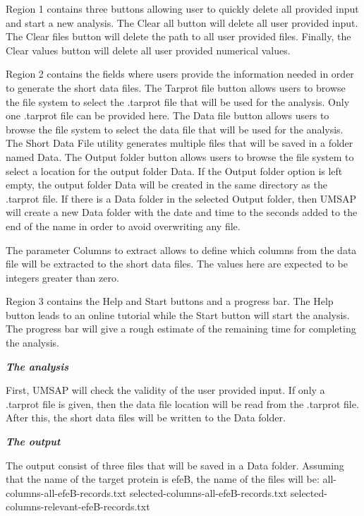 Region \num{1} contains three buttons allowing user to quickly delete all provided input and start a new analysis. The Clear all button will delete all user provided input. The Clear files button will delete the path to all user provided files. Finally, the Clear values button will delete all user provided numerical values.

Region \num{2} contains the fields where users provide the information needed in order to generate the short data files. The Tarprot file button allows users to browse the file system to select the .tarprot file that will be used for the analysis. Only one .tarprot file can be provided here. The Data file button allows users to browse the file system to select the data file that will be used for the analysis. The Short Data File utility generates multiple files that will be saved in a folder named Data. The Output folder button allows users to browse the file system to select a location for the output folder Data. If the Output folder option is left empty, the output folder Data will be created in the same directory as the .tarprot file. If there is a Data folder in the selected Output folder, then UMSAP will create a new Data folder with the date and time to the seconds added to the end of the name in order to avoid overwriting any file. 

The parameter Columns to extract allows to define which columns from the data file will be extracted to the short data files. The values here are expected to be integers greater than zero.

Region \num{3} contains the Help and Start buttons and a progress bar. The Help button leads to an online tutorial while the Start button will start the analysis. The progress bar will give a rough estimate of the remaining time for completing the analysis.

\textit{\textbf{The analysis}}

First, UMSAP will check the validity of the user provided input. If only a .tarprot file is given, then the data file location will be read from the .tarprot file. After this, the short data files will be written to the Data folder.

\textit{\textbf{The output}}

The output consist of three files that will be saved in a Data folder. Assuming that the name of the target protein is efeB, the name of the files will be:\newline 
all-columns-all-efeB-records.txt \newline
selected-columns-all-efeB-records.txt \newline
selected-columns-relevant-efeB-records.txt

